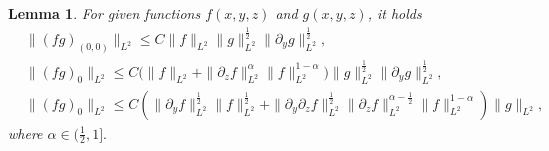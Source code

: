 \documentclass[12pt, reqno]{amsart}
\newtheorem{lemma}{Lemma}[section]
\numberwithin{equation}{section}
\begin{document}
	\begin{lemma}\label{lemma_non_zz0}
		For given functions $f(x,y,z)$ and $g(x,y,z)$, it holds
		\begin{equation}\label{sob_result_6}
			\begin{aligned}
				&\|(fg)_{(0,0)}\|_{L^2}\leq C\|f\|_{L^2}
				\|g\|^{\frac{1}{2}}_{L^2}
				\|\partial_yg\|_{L^2}^{\frac{1}{2}},\\
				&\|(fg)_{0}\|_{L^2}\leq C \big(\|f\|_{L^2}+\|\partial_zf\|_{L^2}^{\alpha}\|f\|_{L^2}^{1-\alpha}\big)
				\|g\|^{\frac{1}{2}}_{L^2}
				\|\partial_yg\|_{L^2}^{\frac{1}{2}},\\
				&\|(fg)_{0}\|_{L^2}\leq C \left(\|\partial_yf\|^{\frac{1}{2}}_{L^2}\|f\|^{\frac{1}{2}}_{L^2}+\|\partial_y\partial_zf\|^{\frac{1}{2}}_{L^2}
				\|\partial_zf\|^{\alpha-\frac{1}{2}}_{L^2}
				\|f\|^{1-\alpha}_{L^2}\right)
				\|g\|_{L^2},	
			\end{aligned}	
		\end{equation}
		where $ \alpha\in(\frac12, 1]. $
	\end{lemma}
\end{document}
